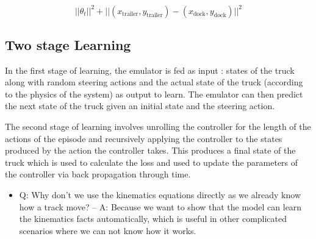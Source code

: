 \begin{equation*}
    ||\theta_{t}||^2 + ||(x_{\text{trailer}}, y_{\text{trailer}}) - (x_{\text{dock}}, y_{\text{dock}})||^2     
\end{equation*}




\subsection{Two stage Learning}
In the first stage of learning, the emulator is fed as input : states of the truck along with random steering actions and the actual state of the truck (according to the physics of the system) as output to learn. The emulator can then predict the next state of the truck given an initial state and the steering action.

The second stage of learning involves unrolling the controller for the length of the actions of the episode and recursively applying the controller to the states produced by the action the controller takes. This produces a final state of the truck which is used to calculate the loss and used to update the parameters of the controller via back propagation through time.

\begin{itemize}
\item Q: Why don't we use the kinematics equations directly as we already know how a track move? 
-- A: Because we want to show that the model can learn the kinematics facts automatically, which is useful in other complicated scenarios where we can not know how it works.
\end{itemize}

